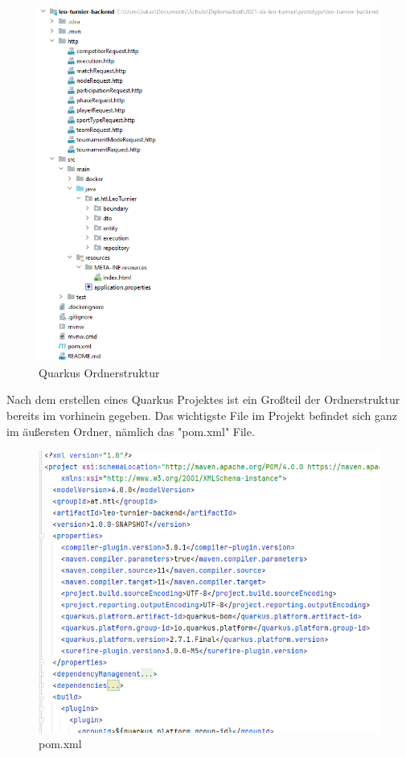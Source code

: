 \begin{figure}[H]
    \includegraphics[scale=0.8]{pics/quarkus_file_structure.png}
    \caption{Quarkus Ordnerstruktur}
\end{figure}

Nach dem erstellen eines Quarkus Projektes ist ein Großteil der Ordnerstruktur bereits im vorhinein gegeben. Das wichtigste File im Projekt befindet sich ganz im äußersten Ordner, nämlich das "pom.xml" File. 

\begin{figure}[H]
    \includegraphics[scale=0.6]{pics/pom.xml.png}
    \caption{pom.xml}
\end{figure}

